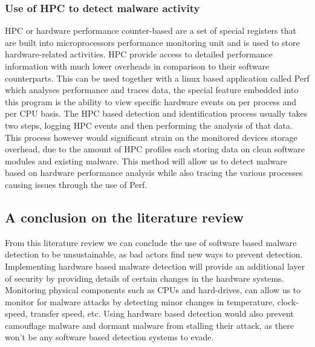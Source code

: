 \documentclass[progress]{cmpreport}
\begin{document}
		 \subsubsection{Use of HPC to detect malware activity}
			HPC or hardware performance counter-based are a set of special registers that are built into microprocessors performance monitoring unit and is used to store hardware-related activities. HPC provide access to detailed performance information with much lower overheads in comparison to their software counterparts\citep{10.1145/2810103.2813642}. This can be used together with a linux based application called Perf which analyses performance and traces data, the special feature embedded into this program is the ability to view specific hardware events on per process and per CPU basis. The HPC based detection and identification process usually takes two steps, logging HPC events and then performing the analysis of that data. This process however would significant strain on the monitored devices storage overhead, due to the amount of HPC profiles each storing data on clean software modules and existing malware. This method will allow us to detect malware based on hardware performance analysis while also tracing the various processes causing issues through the use of Perf. 
			
		\subsection{A conclusion on the literature review}
			From this literature review we can conclude the use of software based malware detection to be unsustainable, as bad actors find new ways to prevent detection. Implementing hardware based malware detection will provide an additional layer of security by providing details of certain changes in the hardware systems. Monitoring physical components such as CPUs and hard-drives, can allow us to monitor for malware attacks by detecting minor changes in temperature, clock-speed, transfer speed, etc. Using hardware based detection would also prevent camouflage malware and dormant malware from stalling their attack, as there won't be any software based detection systems to evade. 
	
\end{document}
